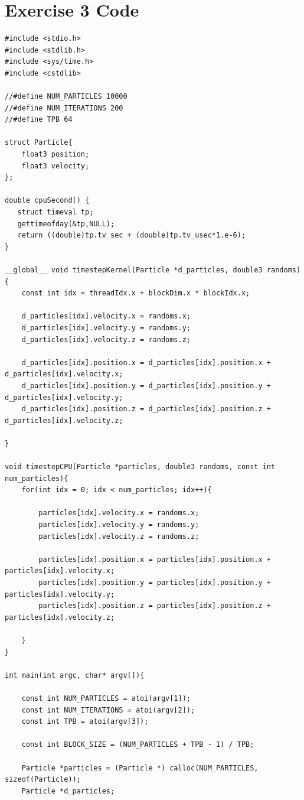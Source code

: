 \documentclass[english]{exam}
\begin{document}
\section*{Exercise 3 Code}

\begin{lstlisting}[style=CStyle]
#include <stdio.h>
#include <stdlib.h>
#include <sys/time.h>
#include <cstdlib>

//#define NUM_PARTICLES 10000
//#define NUM_ITERATIONS 200
//#define TPB 64

struct Particle{
	float3 position;
	float3 velocity;
};

double cpuSecond() {
   struct timeval tp;
   gettimeofday(&tp,NULL);
   return ((double)tp.tv_sec + (double)tp.tv_usec*1.e-6);
}

__global__ void timestepKernel(Particle *d_particles, double3 randoms){
	const int idx = threadIdx.x + blockDim.x * blockIdx.x;

	d_particles[idx].velocity.x = randoms.x;
	d_particles[idx].velocity.y = randoms.y;
	d_particles[idx].velocity.z = randoms.z;

	d_particles[idx].position.x = d_particles[idx].position.x + d_particles[idx].velocity.x;
	d_particles[idx].position.y = d_particles[idx].position.y + d_particles[idx].velocity.y;
	d_particles[idx].position.z = d_particles[idx].position.z + d_particles[idx].velocity.z;
	
}

void timestepCPU(Particle *particles, double3 randoms, const int num_particles){
	for(int idx = 0; idx < num_particles; idx++){
				
		particles[idx].velocity.x = randoms.x;
		particles[idx].velocity.y = randoms.y;
		particles[idx].velocity.z = randoms.z;

		particles[idx].position.x = particles[idx].position.x + particles[idx].velocity.x;
		particles[idx].position.y = particles[idx].position.y + particles[idx].velocity.y;
		particles[idx].position.z = particles[idx].position.z + particles[idx].velocity.z;
	
	}
}

int main(int argc, char* argv[]){

	const int NUM_PARTICLES = atoi(argv[1]);
	const int NUM_ITERATIONS = atoi(argv[2]);
	const int TPB = atoi(argv[3]);

	const int BLOCK_SIZE = (NUM_PARTICLES + TPB - 1) / TPB;

	Particle *particles = (Particle *) calloc(NUM_PARTICLES, sizeof(Particle));
	Particle *d_particles;


\end{lstlisting}
\end{document}

